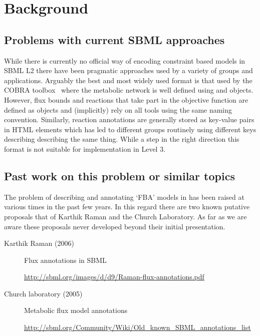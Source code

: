 
\section{ Background }
\label{background}

\subsection{ Problems with current SBML approaches }


While there is currently no official way of encoding constraint based models in SBML L2 there have been pragmatic approaches used by a variety of groups and applications. Arguably the best and most widely used format is that used by the \textsf{COBRA toolbox}~\citep{cobra} where the metabolic network is well defined using \SBML \Reaction and \Species objects. However, flux bounds and reactions that take part in the objective function are defined as \LocalParameter objects and (implicitly) rely on all tools using the same naming convention. Similarly, reaction annotations are generally stored as key-value pairs in HTML \Notes elements which has led to different groups routinely using different keys describing describing the same thing. While a step in the right direction this format is not suitable for implementation in \SBML Level 3.


\subsection{ Past work on this problem or similar topics }
The problem of describing and annotating `FBA' models in \SBML has been raised  at various times in the past few years. In this regard there are two known putative proposals that of Karthik Raman and the Church Laboratory. As far as we are aware these proposals never developed beyond their initial presentation.

\begin{description}
  \item[Karthik Raman (2006)] Flux annotations in SBML
  \item[]\url{http://sbml.org/images/d/d9/Raman-flux-annotations.pdf}
  \item[Church laboratory (2005)] Metabolic flux model annotations
  \item[]\url{http://sbml.org/Community/Wiki/Old_known_SBML_annotations_list}
\end{description}

